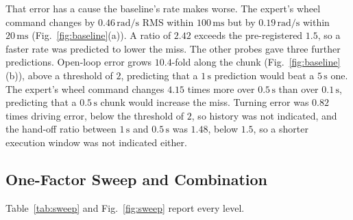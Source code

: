 \documentclass[conference]{IEEEtran}
\begin{document}
That error has a cause the baseline's rate makes worse. The expert's wheel command changes by $0.46\,\mathrm{rad/s}$ RMS within $100\,\mathrm{ms}$ but by $0.19\,\mathrm{rad/s}$ within $20\,\mathrm{ms}$ (Fig.~\ref{fig:baseline}(a)). A ratio of $2.42$ exceeds the pre-registered $1.5$, so a faster rate was predicted to lower the miss. The other probes gave three further predictions. Open-loop error grows $10.4$-fold along the chunk (Fig.~\ref{fig:baseline}(b)), above a threshold of $2$, predicting that a $1\,\mathrm{s}$ prediction would beat a $5\,\mathrm{s}$ one. The expert's wheel command changes $4.15$ times more over $0.5\,\mathrm{s}$ than over $0.1\,\mathrm{s}$, predicting that a $0.5\,\mathrm{s}$ chunk would increase the miss. Turning error was $0.82$ times driving error, below the threshold of $2$, so history was not indicated, and the hand-off ratio between $1\,\mathrm{s}$ and $0.5\,\mathrm{s}$ was $1.48$, below $1.5$, so a shorter execution window was not indicated either.

\subsection{One-Factor Sweep and Combination}
Table~\ref{tab:sweep} and Fig.~\ref{fig:sweep} report every level.
\end{document}
